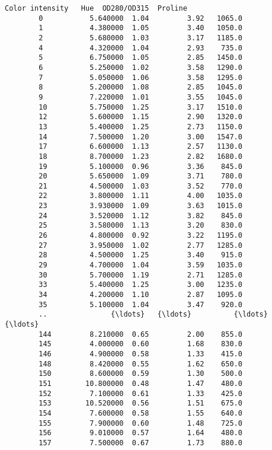\documentclass[11pt]{article}
\begin{document}
\begin{Verbatim}[commandchars=\\\{\}]
             Color intensity   Hue  OD280/OD315  Proline  
        0           5.640000  1.04         3.92   1065.0  
        1           4.380000  1.05         3.40   1050.0  
        2           5.680000  1.03         3.17   1185.0  
        4           4.320000  1.04         2.93    735.0  
        5           6.750000  1.05         2.85   1450.0  
        6           5.250000  1.02         3.58   1290.0  
        7           5.050000  1.06         3.58   1295.0  
        8           5.200000  1.08         2.85   1045.0  
        9           7.220000  1.01         3.55   1045.0  
        10          5.750000  1.25         3.17   1510.0  
        12          5.600000  1.15         2.90   1320.0  
        13          5.400000  1.25         2.73   1150.0  
        14          7.500000  1.20         3.00   1547.0  
        17          6.600000  1.13         2.57   1130.0  
        18          8.700000  1.23         2.82   1680.0  
        19          5.100000  0.96         3.36    845.0  
        20          5.650000  1.09         3.71    780.0  
        21          4.500000  1.03         3.52    770.0  
        22          3.800000  1.11         4.00   1035.0  
        23          3.930000  1.09         3.63   1015.0  
        24          3.520000  1.12         3.82    845.0  
        25          3.580000  1.13         3.20    830.0  
        26          4.800000  0.92         3.22   1195.0  
        27          3.950000  1.02         2.77   1285.0  
        28          4.500000  1.25         3.40    915.0  
        29          4.700000  1.04         3.59   1035.0  
        30          5.700000  1.19         2.71   1285.0  
        33          5.400000  1.25         3.00   1235.0  
        34          4.200000  1.10         2.87   1095.0  
        35          5.100000  1.04         3.47    920.0  
        ..               {\ldots}   {\ldots}          {\ldots}      {\ldots}  
        144         8.210000  0.65         2.00    855.0  
        145         4.000000  0.60         1.68    830.0  
        146         4.900000  0.58         1.33    415.0  
        148         8.420000  0.55         1.62    650.0  
        150         8.600000  0.59         1.30    500.0  
        151        10.800000  0.48         1.47    480.0  
        152         7.100000  0.61         1.33    425.0  
        153        10.520000  0.56         1.51    675.0  
        154         7.600000  0.58         1.55    640.0  
        155         7.900000  0.60         1.48    725.0  
        156         9.010000  0.57         1.64    480.0  
        157         7.500000  0.67         1.73    880.0  

\end{Verbatim}
\end{document}
